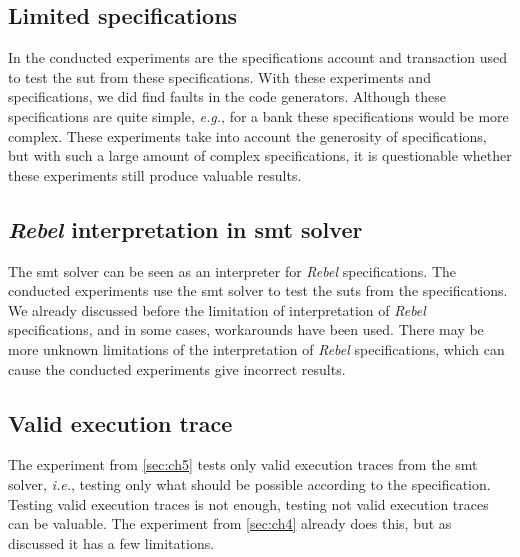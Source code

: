 \subsection*{Limited specifications}
In the conducted experiments are the specifications account and transaction used
to test the \gls{sut} from these specifications. With these experiments
and specifications, we did find faults in the code generators. Although
these specifications are quite simple, \textit{e.g.}, for a bank these
specifications would be more complex. These experiments take into account the
generosity of specifications, but with such a large amount of complex
specifications, it is questionable whether these experiments still produce
valuable results.

\subsection*{\textit{Rebel} interpretation in \gls{smt} solver}
The \gls{smt} solver can be seen as an interpreter for \textit{Rebel} specifications. The
conducted experiments use the \gls{smt} solver to test the \gls{sut}s from the
specifications. We already discussed before the limitation of interpretation of
\textit{Rebel} specifications, and in some cases, workarounds have been used. There may
be more unknown limitations of the interpretation of \textit{Rebel} specifications, which
can cause the conducted experiments give incorrect results.

\subsection*{Valid execution trace}
The experiment from \autoref{sec:ch5} tests only valid execution traces from
the \gls{smt} solver, \textit{i.e.}, testing only what should be possible according to
the specification. Testing valid execution traces is not enough, testing not
valid execution traces can be valuable. The experiment from
\autoref{sec:ch4} already does this, but as discussed it has a few limitations.
